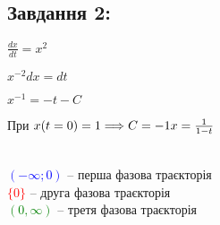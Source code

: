 \subsection{Завдання 2:}

\begin{minipage}{0.49\textwidth}
    $\frac{dx}{dt} = x^2$

    $x^{-2}dx = dt$

    $x^{-1} = -t - C$

    При $x(t = 0) = 1 \Longrightarrow C = -1\\
    x = \frac{1}{1-t}$

\end{minipage}
\begin{minipage}{0.49\textwidth}
    \centering \resizebox*{7cm}{7cm}{}\\
    \textcolor{blue}{$(-\infty;0)$} -- перша фазова траєкторія\\
    \textcolor{red}{$\{0\}$} -- друга фазова траєкторія\\
    \textcolor{green}{$(0, \infty)$} -- третя фазова траєкторія
\end{minipage}

